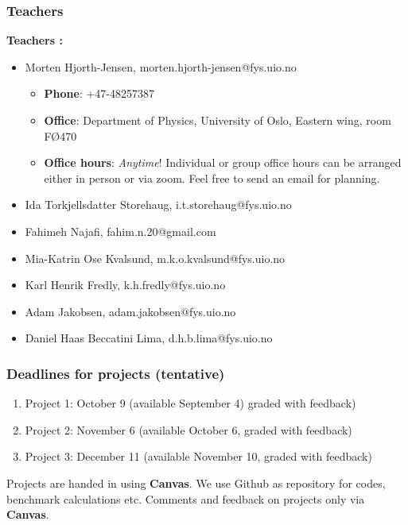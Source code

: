 \documentclass{beamer}
\begin{document}
\begin{frame}
\frametitle{Teachers}

\begin{block}{}

\textbf{Teachers :}
\begin{itemize}
\item Morten Hjorth-Jensen, morten.hjorth-jensen@fys.uio.no
\begin{itemize}

  \item \textbf{Phone}: +47-48257387

  \item \textbf{Office}: Department of Physics, University of Oslo, Eastern wing, room FØ470 

  \item \textbf{Office hours}: \emph{Anytime}!  Individual or group office hours can be arranged either in person or  via zoom. Feel free to send an email for planning. 

\end{itemize}

\noindent
\item Ida Torkjellsdatter Storehaug, i.t.storehaug@fys.uio.no

\item Fahimeh Najafi, fahim.n.20@gmail.com

\item Mia-Katrin Ose Kvalsund, m.k.o.kvalsund@fys.uio.no

\item Karl Henrik Fredly, k.h.fredly@fys.uio.no

\item Adam Jakobsen, adam.jakobsen@fys.uio.no

\item Daniel Haas Beccatini Lima, d.h.b.lima@fys.uio.no
\end{itemize}

\noindent
\end{block}
\end{frame}

\begin{frame}
\frametitle{Deadlines for projects (tentative)}

\begin{block}{}

\begin{enumerate}
\item Project 1: October 9 (available September 4) graded with feedback)

\item Project 2: November 6 (available October 6, graded with feedback)

\item Project 3: December 11  (available November 10, graded with feedback)
\end{enumerate}

\noindent
Projects are handed in using \textbf{Canvas}. We use Github as repository for codes, benchmark calculations etc. Comments and feedback on projects only via \textbf{Canvas}. 

\end{block}
\end{frame}
\end{document}
